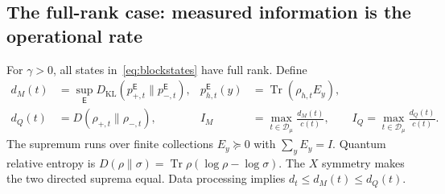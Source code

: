 \documentclass[11pt,a4paper]{article}
\newcommand{\Tr}{\operatorname{Tr}}
\theoremstyle{definition}
\theoremstyle{remark}
\numberwithin{equation}{section}
\begin{document}
\subsection{The full-rank case: measured information is the operational rate}
For $\gamma>0$, all states in~\eqref{eq:blockstates} have full rank. Define
\begin{align}
 d_M(t)&=\sup_{\mathsf E}D_{\mathrm{KL}}
       (p_{+,t}^{\mathsf E}\|p_{-,t}^{\mathsf E}),
 &p_{h,t}^{\mathsf E}(y)&=\Tr(\rho_{h,t}E_y),\label{eq:measured-div}\\
 d_Q(t)&=D(\rho_{+,t}\|\rho_{-,t}),
 & I_M&=\max_{t\in\mathcal D_\mu}\frac{d_M(t)}{c(t)},\qquad
 I_Q=\max_{t\in\mathcal D_\mu}\frac{d_Q(t)}{c(t)}.
\end{align}
The supremum runs over finite collections $E_y\succeq0$ with
$\sum_y E_y=I$. Quantum relative entropy is
$D(\rho\|\sigma)=\Tr\rho(\log\rho-\log\sigma)$.
The $X$ symmetry makes the two directed suprema equal. Data processing
implies $d_t\leq d_M(t)\leq d_Q(t)$.
\end{document}
